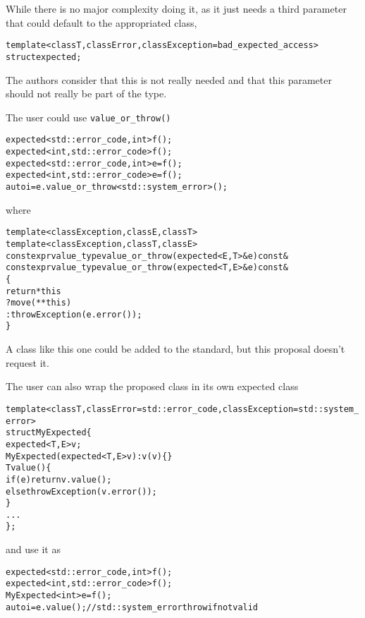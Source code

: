 \documentclass[a4paper,10pt]{article}
\newcommand{\cpp}[1]{\lstinline{#1}}
\newcommand{\suppress}[1]{\colorbox{suppress_color}{#1}}
\newcommand{\update}[1]{\colorbox{update_color}{#1}}
\begin{document}
While there is no major complexity doing it, as it just needs a third parameter that could default to the appropriated class, 

\begin{alltt}
template <class T, class Error, class Exception = bad_expected_access>
  struct expected;
\end{alltt}

\noindent
The authors consider that this is not really needed and that this parameter should not really be part of the type.

The user could use \cpp{value_or_throw()} 

\begin{alltt}
\suppress{expected<std::error_code, int> f();}
\update{expected<int, std::error_code> f();}
\suppress{expected<std::error_code, int> e = f();}
\update{expected<int, std::error_code> e = f();}
auto i = e.value_or_throw<std::system_error>();  
\end{alltt}

\noindent
where 

\begin{alltt}
\suppress{template <class Exception, class E, class T>}
\update{template <class Exception, class T, class E>}
\suppress{constexpr value_type value_or_throw(expected<E,T>& e) const&}
\update{constexpr value_type value_or_throw(expected<T,E>& e) const&}
\{
  return *this
    ? move(**this)
    : throw Exception(e.error());
\}
\end{alltt}

\noindent
A class like this one could be added to the standard, but this proposal doesn't request it. 

The user can also wrap the proposed class in its own expected class

\begin{alltt}
template <class T, class Error=std::error_code, class Exception=std::system_error>
struct MyExpected \{
  expected <T,E> v;
  MyExpected(expected <T,E> v) : v(v) \{\}
  T value() \{  
    if (e) return v.value();
    else throw Exception(v.error());
  \}
  ...
\};
\end{alltt}

\noindent
and use it as

\begin{alltt}
\suppress{expected<std::error_code, int> f();}
\update{expected<int, std::error_code> f();}
MyExpected<int> e = f();
auto i = e.value();  // std::system_error throw if not valid
\end{alltt}
\end{document}
